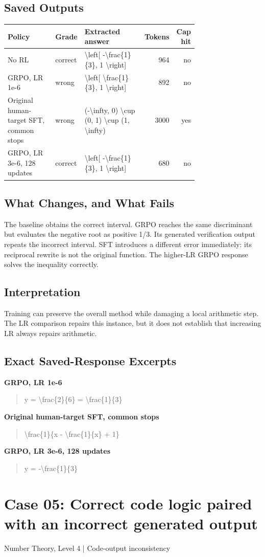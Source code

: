 \documentclass[10pt,letterpaper]{article}
\begin{document}
\subsection*{Saved Outputs}
\small\begin{longtable}{p{0.29\linewidth}p{0.10\linewidth}p{0.35\linewidth}rr}\toprule Policy & Grade & Extracted answer & Tokens & Cap hit\\\midrule
No RL & correct & \textbackslash{}left[ -\textbackslash{}frac\{1\}\{3\}, 1 \textbackslash{}right] & 964 & no\\
GRPO, LR 1e-6 & wrong & \textbackslash{}left[ \textbackslash{}frac\{1\}\{3\}, 1 \textbackslash{}right] & 892 & no\\
Original human-target SFT, common stops & wrong & (-\textbackslash{}infty, 0) \textbackslash{}cup (0, 1) \textbackslash{}cup (1, \textbackslash{}infty) & 3000 & yes\\
GRPO, LR 3e-6, 128 updates & correct & \textbackslash{}left[ -\textbackslash{}frac\{1\}\{3\}, 1 \textbackslash{}right] & 680 & no\\
\bottomrule\end{longtable}\normalsize
\subsection*{What Changes, and What Fails}
The baseline obtains the correct interval. GRPO reaches the same discriminant but evaluates the negative root as positive 1/3. Its generated verification output repeats the incorrect interval. SFT introduces a different error immediately: its reciprocal rewrite is not the original function. The higher-LR GRPO response solves the inequality correctly.
\subsection*{Interpretation}
Training can preserve the overall method while damaging a local arithmetic step. The LR comparison repairs this instance, but it does not establish that increasing LR always repairs arithmetic.
\subsection*{Exact Saved-Response Excerpts}
\textbf{GRPO, LR 1e-6}
\begin{quote}\small\raggedright y = \textbackslash{}frac\{2\}\{6\} = \textbackslash{}frac\{1\}\{3\}\end{quote}
\textbf{Original human-target SFT, common stops}
\begin{quote}\small\raggedright \textbackslash{}frac\{1\}\{x - \textbackslash{}frac\{1\}\{x\} + 1\}\end{quote}
\textbf{GRPO, LR 3e-6, 128 updates}
\begin{quote}\small\raggedright y = -\textbackslash{}frac\{1\}\{3\}\end{quote}
\clearpage\section*{Case 05: Correct code logic paired with an incorrect generated output}
Number Theory, Level 4 | Code-output inconsistency
\end{document}
